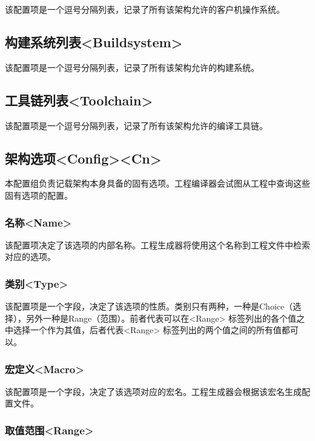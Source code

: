该配置项是一个逗号分隔列表，记录了所有该架构允许的客户机操作系统。

\subsection{构建系统列表<Buildsystem>{}}\label{subsec:5-4-6}

该配置项是一个逗号分隔列表，记录了所有该架构允许的构建系统。

\subsection{工具链列表<Toolchain>{}}\label{subsec:5-4-7}

该配置项是一个逗号分隔列表，记录了所有该架构允许的编译工具链。

\subsection{架构选项<Config><Cn>{}}\label{subsec:5-4-8}

本配置组负责记载架构本身具备的固有选项。工程编译器会试图从工程中查询这些固有选项的配置。

\subsubsection{名称<Name>{}}\label{subsubsec:5-4-8-1}

该配置项决定了该选项的内部名称。工程生成器将使用这个名称到工程文件中检索对应的选项。

\subsubsection{类别<Type>{}}\label{subsubsec:5-4-8-2}

该配置项是一个字段，决定了该选项的性质。类别只有两种，一种是Choice（选择），另外一种是Range（范围）。前者代表可以在<Range> 标签列出的各个值之中选择一个作为其值，后者代表<Range> 标签列出的两个值之间的所有值都可以。

\subsubsection{宏定义<Macro>{}}\label{subsubsec:5-4-8-3}

该配置项是一个字段，决定了该选项对应的宏名。工程生成器会根据该宏名生成配置文件。

\subsubsection{取值范围<Range>{}}\label{subsubsec:5-4-8-4}

